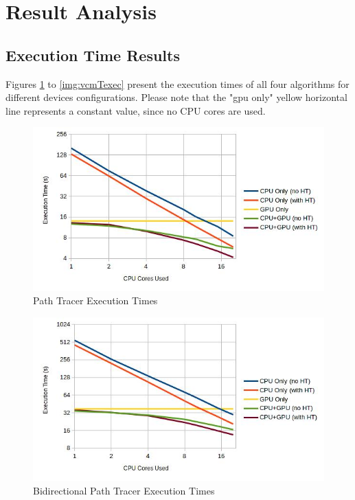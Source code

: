 \section{Result Analysis}

\subsection{\label{sec:texec}Execution Time Results}

Figures \ref{img:ptTexec} to \ref{img:vcmTexec} present the execution times of all four algorithms for different devices configurations. Please note that the "\gls{gpu} only" yellow horizontal line represents a constant value, since no CPU cores are used.

\begin{figure}[H]
\centering
\includegraphics[width=0.8\linewidth]{img/ptTexec.jpg}
\caption{\label{img:ptTexec} Path Tracer Execution Times}
\end{figure}

\begin{figure}[H]
\centering
\includegraphics[width=0.8\linewidth]{img/bptTexec.jpg}
\caption{\label{img:bptTexec} Bidirectional Path Tracer Execution Times}
\end{figure}

